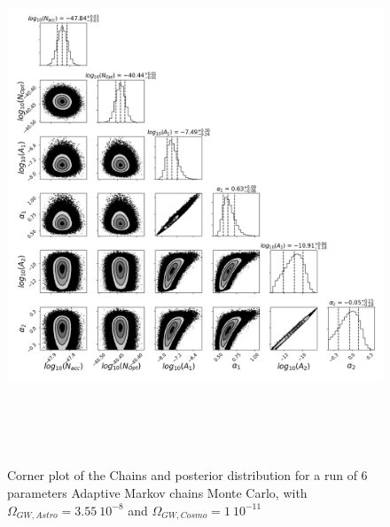 \documentclass[a4paper,12pt]{article}
\begin{document}
\begin{figure}[H]
    \centering
    \includegraphics[height= 16cm]{FisherAET/1/corners.png}
    \caption{Corner plot of the Chains and posterior distribution for a run of 6 parameters Adaptive Markov chains Monte Carlo, with $\Omega_{GW,Astro} = 3.55 \ 10^{-8}$ and  $\Omega_{GW,Cosmo} = 1 \ 10^{-11}$}
    \label{fig:Corner6param}
\end{figure}
\end{document}
